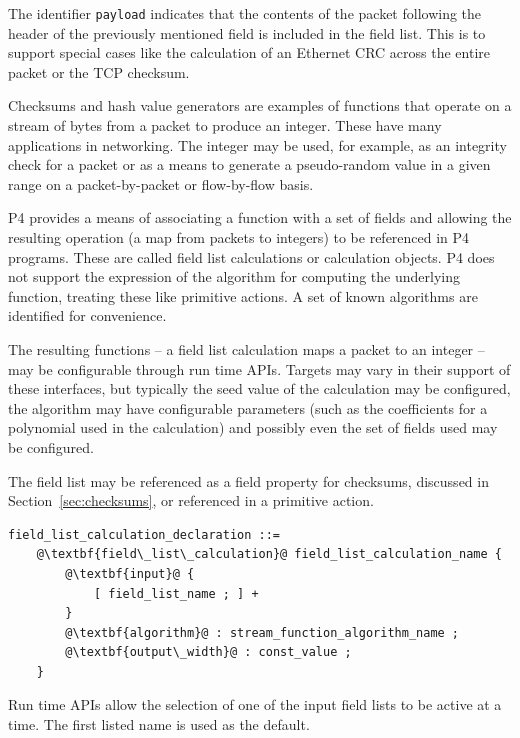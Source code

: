 \documentclass[12pt]{article}
\begin{document}
The identifier \texttt{payload} indicates that the contents of the
packet following the header of the previously mentioned field is
included in the field list.  This is to support special cases like the
calculation of an Ethernet CRC across the entire packet or the TCP
checksum.


Checksums and hash value generators are examples of functions that operate on a
stream of bytes from a packet to produce an integer. These have many
applications in networking. The integer may be used, for example, as an
integrity check for a packet or as a means to generate a pseudo-random value in
a given range on a packet-by-packet or flow-by-flow basis.

P4 provides a means of associating a function with a set of fields and
allowing the resulting operation (a map from packets to integers) to
be referenced in P4 programs.  These are called field list
calculations or calculation objects.  P4 does not support the
expression of the algorithm for computing the underlying function,
treating these like primitive actions. A set of known algorithms are
identified for convenience.

The resulting functions -- a field list calculation maps a packet to
an integer -- may be configurable through run time APIs. Targets may
vary in their support of these interfaces, but typically the seed
value of the calculation may be configured, the algorithm may have
configurable parameters (such as the coefficients for a polynomial
used in the calculation) and possibly even the set of fields used may
be configured.

The field list may be referenced as a field property for checksums,
discussed in Section~\ref{sec:checksums}, or referenced in a primitive action.

\begin{lstlisting}[frame=single,backgroundcolor=\color{bnfgreen},escapechar=\@]
field_list_calculation_declaration ::=
    @\textbf{field\_list\_calculation}@ field_list_calculation_name {
        @\textbf{input}@ {
            [ field_list_name ; ] +
        }
        @\textbf{algorithm}@ : stream_function_algorithm_name ;
        @\textbf{output\_width}@ : const_value ;
    }
\end{lstlisting}

Run time APIs allow the selection of one of the input field lists to
be active at a time. The first listed name is used as the default.
\end{document}
